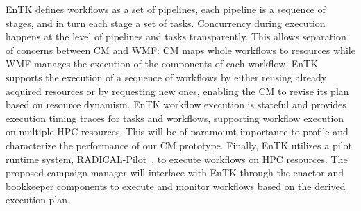 EnTK defines workflows as a set of pipelines, each pipeline is a sequence of stages, and in turn each stage a set of tasks.
Concurrency during execution happens at the level of pipelines and tasks transparently. 
This allows separation of concerns between CM and WMF: CM maps whole workflows to resources while WMF manages the execution of the components of each workflow.
EnTK supports the execution of a sequence of workflows by either reusing already acquired resources or by requesting new ones, enabling the CM to revise its plan based on resource dynamism.
EnTK workflow execution is stateful and provides execution timing traces for tasks and workflows, supporting workflow execution on multiple HPC resources. 
This will be of paramount importance to profile and characterize the performance of our CM prototype.
Finally, EnTK utilizes a pilot runtime system, RADICAL-Pilot~\cite{merzky2019using}, to execute workflows on HPC resources.
The proposed campaign manager will interface with EnTK through the enactor and bookkeeper components to execute and monitor workflows based on the derived execution plan.

